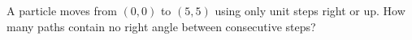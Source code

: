 A particle moves from $(0,0)$ to $(5,5)$ using only unit steps right or up. How many paths contain no right angle between consecutive steps?
